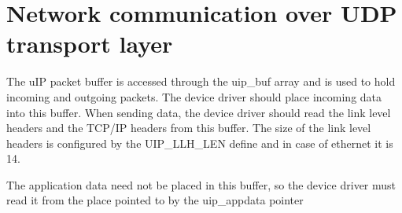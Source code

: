 \section{Network communication over UDP transport layer}
The uIP packet buffer is accessed through
the uip\_buf array and is used to hold incoming and outgoing packets.
The device driver should place incoming data into this buffer.
When sending data, the device driver should read the link
level headers and the TCP/IP headers from this buffer.
The size of the link level headers is configured by the UIP\_LLH\_LEN
define and in case of ethernet it is 14.

The application data need not be placed in this buffer, so
the device driver must read it from the place pointed to by the
uip\_appdata pointer %
